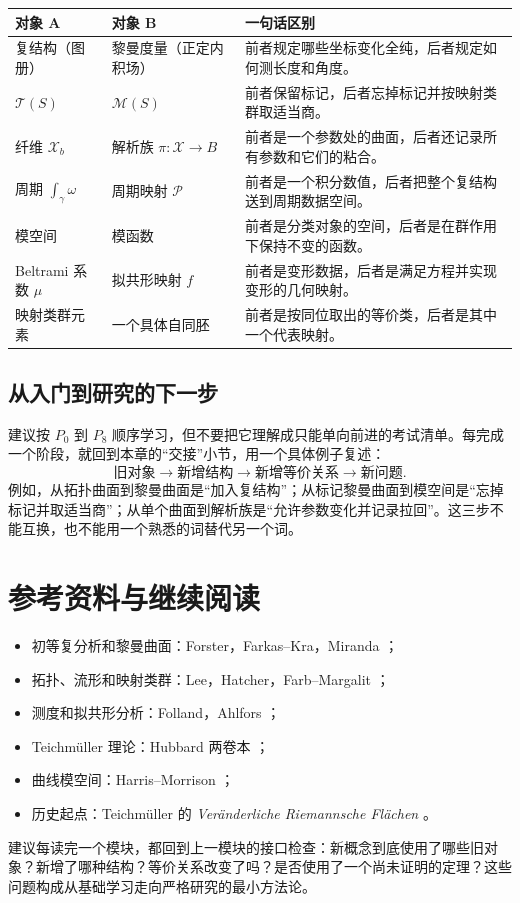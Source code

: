 \documentclass[UTF8,fontset=none,a4paper,11pt]{ctexart}
\theoremstyle{foundation-definition}
\theoremstyle{foundation-theorem}
\theoremstyle{foundation-proposition}
\theoremstyle{foundation-example}
\theoremstyle{foundation-remark}
\theoremstyle{foundation-theorem}
\newcommand{\T}{\mathcal T}
\newcommand{\M}{\mathcal M}
\begin{document}
\begin{center}
{\small
\begin{tabularx}{\textwidth}{p{}p{}X}
\toprule
对象 A & 对象 B & 一句话区别 \\
\midrule
复结构（图册） & 黎曼度量（正定内积场） & 前者规定哪些坐标变化全纯，后者规定如何测长度和角度。 \\
\(\T(S)\) & \(\M(S)\) & 前者保留标记，后者忘掉标记并按映射类群取适当商。 \\
纤维 \(\mathcal X_b\) & 解析族 \(\pi:\mathcal X\to B\) & 前者是一个参数处的曲面，后者还记录所有参数和它们的粘合。 \\
周期 \(\int_\gamma\omega\) & 周期映射 \(\mathcal P\) & 前者是一个积分数值，后者把整个复结构送到周期数据空间。 \\
模空间 & 模函数 & 前者是分类对象的空间，后者是在群作用下保持不变的函数。 \\
Beltrami 系数 \(\mu\) & 拟共形映射 \(f\) & 前者是变形数据，后者是满足方程并实现变形的几何映射。 \\
映射类群元素 & 一个具体自同胚 & 前者是按同位取出的等价类，后者是其中一个代表映射。 \\
\bottomrule
\end{tabularx}
}
\end{center}

\subsection{从入门到研究的下一步}

建议按 \(P_0\) 到 \(P_8\) 顺序学习，但不要把它理解成只能单向前进的考试清单。每完成一个阶段，就回到本章的“交接”小节，用一个具体例子复述：
\[
\text{旧对象}\longrightarrow\text{新增结构}\longrightarrow\text{新增等价关系}\longrightarrow\text{新问题}.
\]
例如，从拓扑曲面到黎曼曲面是“加入复结构”；从标记黎曼曲面到模空间是“忘掉标记并取适当商”；从单个曲面到解析族是“允许参数变化并记录拉回”。这三步不能互换，也不能用一个熟悉的词替代另一个词。

\clearpage
\section{参考资料与继续阅读}

\begin{itemize}
  \item 初等复分析和黎曼曲面：Forster，Farkas--Kra，Miranda \cite{Forster1981,FarkasKra1992,Miranda1995}；
  \item 拓扑、流形和映射类群：Lee，Hatcher，Farb--Margalit \cite{Lee2011,Lee2012Smooth,Hatcher2002,FarbMargalit2012}；
  \item 测度和拟共形分析：Folland，Ahlfors \cite{Folland1999,Ahlfors2006}；
  \item Teichmüller 理论：Hubbard 两卷本 \cite{Hubbard2006,Hubbard2016}；
  \item 曲线模空间：Harris--Morrison \cite{HarrisMorrison1998}；
  \item 历史起点：Teichmüller 的 \emph{Veränderliche Riemannsche Flächen} \cite{Teichmueller1944}。
\end{itemize}

建议每读完一个模块，都回到上一模块的接口检查：新概念到底使用了哪些旧对象？新增了哪种结构？等价关系改变了吗？是否使用了一个尚未证明的定理？这些问题构成从基础学习走向严格研究的最小方法论。



\end{document}
